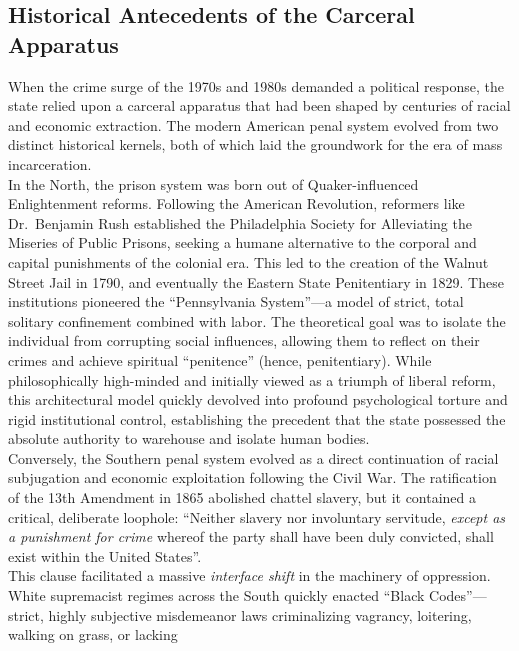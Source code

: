 \documentclass[
]{article}
\begin{document}
\subsection{\texorpdfstring{\textbf{Historical Antecedents of the
Carceral
Apparatus}}{Historical Antecedents of the Carceral Apparatus}}\label{historical-antecedents-of-the-carceral-apparatus}

When the crime surge of the 1970s and 1980s demanded a political
response, the state relied upon a carceral apparatus that had been
shaped by centuries of racial and economic extraction. The modern
American penal system evolved from two distinct historical kernels, both
of which laid the groundwork for the era of mass incarceration.\\
In the North, the prison system was born out of Quaker-influenced
Enlightenment reforms. Following the American Revolution, reformers like
Dr.~Benjamin Rush established the Philadelphia Society for Alleviating
the Miseries of Public Prisons, seeking a humane alternative to the
corporal and capital punishments of the colonial era. This led to the
creation of the Walnut Street Jail in 1790, and eventually the Eastern
State Penitentiary in 1829. These institutions pioneered the
``Pennsylvania System''---a model of strict, total solitary confinement
combined with labor. The theoretical goal was to isolate the individual
from corrupting social influences, allowing them to reflect on their
crimes and achieve spiritual ``penitence'' (hence, penitentiary). While
philosophically high-minded and initially viewed as a triumph of liberal
reform, this architectural model quickly devolved into profound
psychological torture and rigid institutional control, establishing the
precedent that the state possessed the absolute authority to warehouse
and isolate human bodies.\\
Conversely, the Southern penal system evolved as a direct continuation
of racial subjugation and economic exploitation following the Civil War.
The ratification of the 13th Amendment in 1865 abolished chattel
slavery, but it contained a critical, deliberate loophole: ``Neither
slavery nor involuntary servitude, \emph{except as a punishment for
crime} whereof the party shall have been duly convicted, shall exist
within the United States''.\\
This clause facilitated a massive \emph{interface shift} in the
machinery of oppression. White supremacist regimes across the South
quickly enacted ``Black Codes''---strict, highly subjective misdemeanor
laws criminalizing vagrancy, loitering, walking on grass, or lacking
\end{document}
